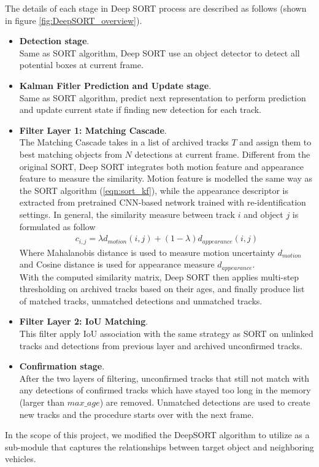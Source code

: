 The details of each stage in Deep SORT process are described as follows (shown in figure \ref{fig:DeepSORT_overview}).
\begin{itemize}
    \item \textbf{Detection stage}. \\
    Same as SORT algorithm, Deep SORT use an object detector to detect all potential boxes at current frame.
    \item \textbf{Kalman Fitler Prediction and Update stage}. \\
    Same as SORT algorithm, predict next representation to perform prediction and update current state if finding new detection for each track.
    \item \textbf{Filter Layer 1: Matching Cascade}. \\
    The Matching Cascade takes in a list of archived tracks $T$ and assign them to best matching objects from $N$ detections at current frame. Different from the original SORT, Deep SORT integrates both motion feature and appearance feature to measure the similarity. 
    Motion feature is modelled the same way as the SORT algorithm (\ref{eqn:sort_kf}), while the appearance descriptor is extracted from pretrained CNN-based network trained with re-identification settings. 
    In general, the similarity measure between track $i$ and object $j$ is formulated as follow
    \begin{align}
        \label{eqn:deepsort_score}
        c_{i,j} = \lambda d_{motion}(i, j) + (1-\lambda) d_{appearance}(i, j)
    \end{align}
    Where Mahalanobis distance is used to measure motion uncertainty $d_{motion}$ and Cosine distance is used for appearance measure $d_{appearance}$. \\
    With the computed similarity matrix, Deep SORT then applies multi-step thresholding on archived tracks based on their ages, and finally produce list of matched tracks, unmatched detections and unmatched tracks.
    \item \textbf{Filter Layer 2: IoU Matching}. \\
    This filter apply IoU association with the same strategy as SORT on unlinked tracks and detections from previous layer and archived unconfirmed tracks. 
    \item \textbf{Confirmation stage}. \\
    After the two layers of filtering, unconfirmed tracks that still not match with any detections of confirmed tracks which have stayed too long in the memory (larger than $max\_age$) are removed. Unmatched detections are used to create new tracks and the procedure starts over with the next frame.
\end{itemize}
In the scope of this project, we modified the DeepSORT algorithm \cite{wojke2017simple} to utilize as a sub-module that captures the relationships between target object and neighboring vehicles.
